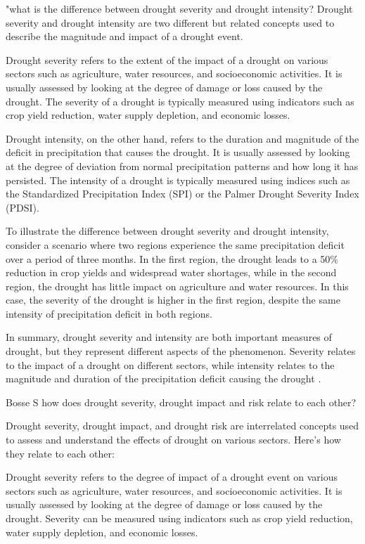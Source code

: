 {%
"what is the difference between drought severity and drought intensity?
Drought severity and drought intensity are two different but related concepts used to describe the magnitude and impact of a drought event.

Drought severity refers to the extent of the impact of a drought on various sectors such as agriculture, water resources, and socioeconomic activities. It is usually assessed by looking at the degree of damage or loss caused by the drought. The severity of a drought is typically measured using indicators such as crop yield reduction, water supply depletion, and economic losses.

Drought intensity, on the other hand, refers to the duration and magnitude of the deficit in precipitation that causes the drought. It is usually assessed by looking at the degree of deviation from normal precipitation patterns and how long it has persisted. The intensity of a drought is typically measured using indices such as the Standardized Precipitation Index (SPI) or the Palmer Drought Severity Index (PDSI).

To illustrate the difference between drought severity and drought intensity, consider a scenario where two regions experience the same precipitation deficit over a period of three months. In the first region, the drought leads to a 50\% reduction in crop yields and widespread water shortages, while in the second region, the drought has little impact on agriculture and water resources. In this case, the severity of the drought is higher in the first region, despite the same intensity of precipitation deficit in both regions.

In summary, drought severity and intensity are both important measures of drought, but they represent different aspects of the phenomenon. Severity relates to the impact of a drought on different sectors, while intensity relates to the magnitude and duration of the precipitation deficit causing the drought \autocite{rcrcFORECASTBASEDFINANCINGEARLY2020,vereintenationenSpecialReportDrought2021}.




Bosse S
how does drought severity, drought impact and risk relate to each other?

Drought severity, drought impact, and drought risk are interrelated concepts used to assess and understand the effects of drought on various sectors. Here's how they relate to each other:

Drought severity refers to the degree of impact of a drought event on various sectors such as agriculture, water resources, and socioeconomic activities. It is usually assessed by looking at the degree of damage or loss caused by the drought. Severity can be measured using indicators such as crop yield reduction, water supply depletion, and economic losses.

}
